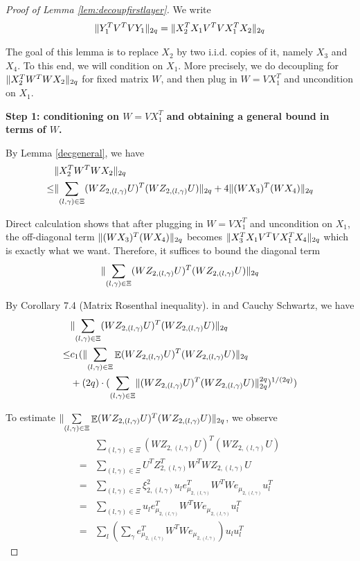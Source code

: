 \documentclass[11pt]{amsart}
\numberwithin{equation}{section}
\numberwithin{equation}{section}
\DeclareMathOperator{\E}{\mathbb{E}}
\DeclarePairedDelimiter{\norm}{\lVert}{\rVert}
\begin{document}
\begin{proof}[Proof of Lemma \ref{lem:decoupfirstlayer}]

We write
\begin{align*}
    \norm{Y_1^TV^TVY_1}_{2q}=\norm{X_2^TX_1V^TVX_1^TX_2}_{2q}
\end{align*}

The goal of this lemma is to replace $X_2$ by two i.i.d. copies of it, namely $X_3$ and $X_4$. To this end, we will condition on $X_1$. More precisely, we do decoupling for $\norm{X_2^TW^TWX_2}_{2q}$ for fixed matrix $W$, and then plug in $W=VX_1^T$ and uncondition on $X_1$.

\textbf{Step 1: conditioning on $W=VX_1^T$ and obtaining a general bound in terms of $W$.}

By Lemma \ref{decgeneral}, we have
\begin{align*}
    &\norm{X_2^TW^TWX_2}_{2q}\\ \le &\norm{\sum \limits_{(l,\gamma) \in \Xi}(WZ_{2,(l,\gamma)}U)^T(WZ_{2,(l,\gamma)}U)}_{2q}+4\norm{(WX_3)^T(WX_{4})}_{2q}
\end{align*}

Direct calculation shows that after plugging in $W=VX_1^T$ and uncondition on $X_1$, the off-diagonal term $\norm{(WX_3)^T(WX_{4})}_{2q}$ becomes $\norm{X_3^TX_1V^TVX_1^TX_4}_{2q}$ which is exactly what we want. Therefore, it suffices to bound the diagonal term
\begin{align*}
    \norm{\sum \limits_{(l,\gamma) \in \Xi}(WZ_{2,(l,\gamma)}U)^T(WZ_{2,(l,\gamma)}U)}_{2q}
\end{align*}

By Corollary 7.4 (Matrix Rosenthal inequality). in \cite{mackey2014matrix} and Cauchy Schwartz, we have
\begin{align*}
    &\norm{\sum \limits_{(l,\gamma) \in \Xi}(WZ_{2,(l,\gamma)}U)^T(WZ_{2,(l,\gamma)}U)}_{2q} \\\le& c_1 (\norm{\sum \limits_{(l,\gamma) \in \Xi}\E(WZ_{2,(l,\gamma)}U)^T(WZ_{2,(l,\gamma)}U)}_{2q}\\&+(2q)\cdot (\sum \limits_{(l,\gamma) \in \Xi} \norm{(WZ_{2,(l,\gamma)}U)^T(WZ_{2,(l,\gamma)}U)}_{2q}^{2q})^{1/(2q)})
\end{align*}

To estimate $\norm{\sum \limits_{(l,\gamma) \in \Xi}\E(WZ_{2,(l,\gamma)}U)^T(WZ_{2,(l,\gamma)}U)}_{2q}$, we observe
\begin{align*}
    &\sum \limits_{(l,\gamma) \in \Xi}(WZ_{2,(l,\gamma)}U)^T(WZ_{2,(l,\gamma)}U)\\=&\sum \limits_{(l,\gamma) \in \Xi}U^TZ_{2,(l,\gamma)}^TW^TWZ_{2,(l,\gamma)}U\\=& \sum \limits_{(l,\gamma) \in \Xi}\xi_{2,(l,\gamma)}^2u_le_{\mu_{2,(l,\gamma)}}^TW^TWe_{\mu_{2,(l,\gamma)}}u_l^T
    \\=&\sum \limits_{(l,\gamma) \in \Xi}u_le_{\mu_{2,(l,\gamma)}}^TW^TWe_{\mu_{2,(l,\gamma)}}u_l^T
    \\=&\sum \limits_{l}(\sum \limits_{\gamma}e_{\mu_{2,(l,\gamma)}}^TW^TWe_{\mu_{2,(l,\gamma)}})u_lu_l^T
\end{align*}


\end{proof}
\end{document}
